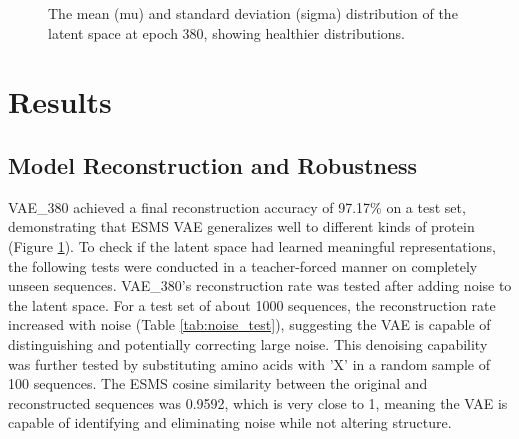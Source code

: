 \documentclass[unnumsec,webpdf,contemporary,medium]{oup-authoring-template}
\begin{document}
\begin{figure}[!ht]
    \centering
    \hfill
    \caption{The mean (mu) and standard deviation (sigma) distribution of the latent space at epoch 380, showing healthier distributions.}
    \label{fig:dist_380}
\end{figure}

\section{Results}\label{sec:results}
\subsection{Model Reconstruction and Robustness}\label{subsec:reconstruction_robustness}
VAE\_380 achieved a final reconstruction accuracy of 97.17\% on a test set, demonstrating that ESMS VAE generalizes well to different kinds of protein (Figure \ref{fig:dist_380}). To check if the latent space had learned meaningful representations, the following tests were conducted in a teacher-forced manner on completely unseen sequences. VAE\_380's reconstruction rate was tested after adding noise to the latent space. For a test set of about 1000 sequences, the reconstruction rate increased with noise (Table \ref{tab:noise_test}), suggesting the VAE is capable of distinguishing and potentially correcting large noise. This denoising capability was further tested by substituting amino acids with 'X' in a random sample of 100 sequences. The ESMS cosine similarity between the original and reconstructed sequences was 0.9592, which is very close to 1, meaning the VAE is capable of identifying and eliminating noise while not altering structure.
\end{document}
